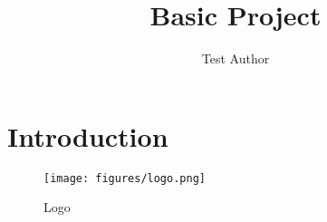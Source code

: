 \documentclass{article}
\title{Basic Project}
\author{Test Author}
\begin{document}
\maketitle

\section{Introduction}

\begin{figure}[h]
    \centering
    \texttt{[image: figures/logo.png]} %
    \caption{Logo}
\end{figure}

\printbibliography
\end{document}
